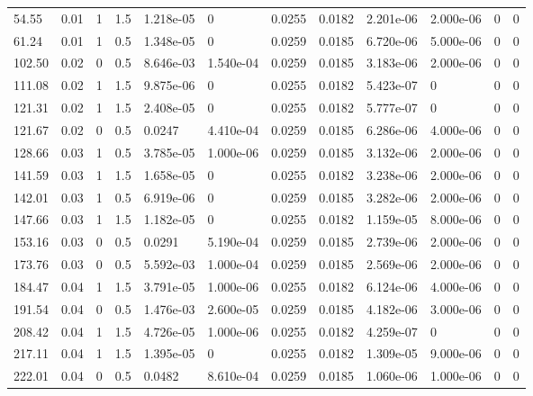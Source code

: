 \documentclass[preview]{standalone}
\begin{document}
{{\begin{tabular}{L{1.2cm}C{1.2cm} C{0.3cm}C{0.5cm} C{1.4cm}C{1.4cm} C{1.4cm}C{1.4cm} C{1.6cm}C{1.6cm} C{1.6cm}C{1.6cm}}
  54.55  &  0.01  & 1     & 1.5 &  1.218e-05  & 0  &  0.0255&   0.0182& 2.201e-06 & 2.000e-06   &  0 & 0  \\ 
  61.24  &  0.01  & 1     & 0.5 &  1.348e-05  & 0  &  0.0259&   0.0185& 6.720e-06 & 5.000e-06   &  0 & 0  \\ 
  102.50  &  0.02  & 0     & 0.5 &  8.646e-03  & 1.540e-04  &  0.0259&   0.0185& 3.183e-06 & 2.000e-06   &  0 & 0  \\ 
  111.08  &  0.02  & 1     & 1.5 &  9.875e-06  & 0  &  0.0255&   0.0182& 5.423e-07 & 0   &  0 & 0  \\ 
  121.31  &  0.02  & 1     & 1.5 &  2.408e-05  & 0  &  0.0255&   0.0182& 5.777e-07 & 0   &  0 & 0  \\ 
  121.67  &  0.02  & 0     & 0.5 &  0.0247  & 4.410e-04  &  0.0259&   0.0185& 6.286e-06 & 4.000e-06   &  0 & 0  \\ 
  128.66  &  0.03  & 1     & 0.5 &  3.785e-05  & 1.000e-06  &  0.0259&   0.0185& 3.132e-06 & 2.000e-06   &  0 & 0  \\ 
  141.59  &  0.03  & 1     & 1.5 &  1.658e-05  & 0  &  0.0255&   0.0182& 3.238e-06 & 2.000e-06   &  0 & 0  \\ 
  142.01  &  0.03  & 1     & 0.5 &  6.919e-06  & 0  &  0.0259&   0.0185& 3.282e-06 & 2.000e-06   &  0 & 0  \\ 
  147.66  &  0.03  & 1     & 1.5 &  1.182e-05  & 0  &  0.0255&   0.0182& 1.159e-05 & 8.000e-06   &  0 & 0  \\ 
  153.16  &  0.03  & 0     & 0.5 &  0.0291  & 5.190e-04  &  0.0259&   0.0185& 2.739e-06 & 2.000e-06   &  0 & 0  \\ 
  173.76  &  0.03  & 0     & 0.5 &  5.592e-03  & 1.000e-04  &  0.0259&   0.0185& 2.569e-06 & 2.000e-06   &  0 & 0  \\ 
  184.47  &  0.04  & 1     & 1.5 &  3.791e-05  & 1.000e-06  &  0.0255&   0.0182& 6.124e-06 & 4.000e-06   &  0 & 0  \\ 
  191.54  &  0.04  & 0     & 0.5 &  1.476e-03  & 2.600e-05  &  0.0259&   0.0185& 4.182e-06 & 3.000e-06   &  0 & 0  \\ 
  208.42  &  0.04  & 1     & 1.5 &  4.726e-05  & 1.000e-06  &  0.0255&   0.0182& 4.259e-07 & 0   &  0 & 0  \\ 
  217.11  &  0.04  & 1     & 1.5 &  1.395e-05  & 0  &  0.0255&   0.0182& 1.309e-05 & 9.000e-06   &  0 & 0  \\ 
  222.01  &  0.04  & 0     & 0.5 &  0.0482  & 8.610e-04  &  0.0259&   0.0185& 1.060e-06 & 1.000e-06   &  0 & 0  \\ 

\end{tabular}}}
\end{document}

